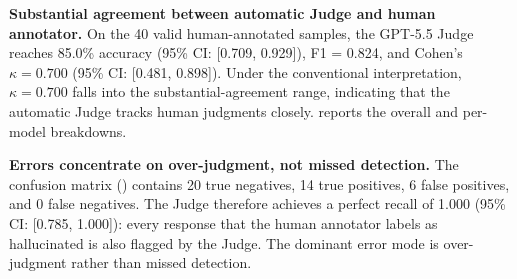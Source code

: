 \textbf{Substantial agreement between automatic Judge and human annotator.}
On the 40 valid human-annotated samples,
the GPT-5.5 Judge reaches 85.0\% accuracy
(95\% CI: [0.709, 0.929]),
F1 = 0.824,
and Cohen's $\kappa = 0.700$
(95\% CI: [0.481, 0.898]).
Under the conventional interpretation,
$\kappa = 0.700$ falls into the substantial-agreement range,
indicating that the automatic Judge tracks
human judgments closely.
 reports
the overall and per-model breakdowns.

\begin{table}[htbp]
  \centering
  \caption{Human alignment results.
    Per-model intervals are wide because each model
    is evaluated on only 10 samples.}
  \label{tab:human_alignment_results}
\end{table}

\textbf{Errors concentrate on over-judgment, not missed detection.}
The confusion matrix ()
contains 20 true negatives, 14 true positives,
6 false positives, and 0 false negatives.
The Judge therefore achieves
a perfect recall of 1.000 (95\% CI: [0.785, 1.000]):
every response that the human annotator labels as hallucinated
is also flagged by the Judge.
The dominant error mode is over-judgment
rather than missed detection.

